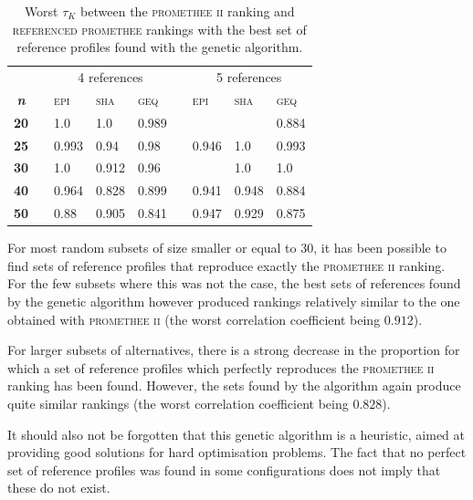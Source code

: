 \begin{table}[h]
    \centering
    \begin{tabular}{c l l l l l l l l}
        \toprule
        & & \multicolumn{3}{c}{4 references} &\phantom{abc} & \multicolumn{3}{c}{5 references} \\
        \cmidrule{3-5} \cmidrule{7-9}
        \bf \textit{n} & & \textsc{epi} &  \textsc{sha} & \textsc{geq}& &  \textsc{epi} &  \textsc{sha} & \textsc{geq}  \\
        \midrule
         \bf 20  & &  1.0   & 1.0    & 0.989 & &        &       & 0.884 \\
         \bf 25  & &  0.993 & 0.94   & 0.98  & &  0.946 &  1.0  & 0.993 \\
         \bf 30  & &  1.0   & 0.912  & 0.96  & &        &  1.0  &  1.0 \\
         \bf 40  & &  0.964 & 0.828  & 0.899 & &  0.941 &  0.948 & 0.884 \\
         \bf 50  & &  0.88  & 0.905  & 0.841 & &  0.947 &  0.929 & 0.875 \\
        \bottomrule
    \end{tabular}
    \caption{Worst $\tau_K$ between the \textsc{promethee ii} ranking and \textsc{referenced promethee} rankings with the best set of reference profiles found with the genetic algorithm.}
    \label{tbl:genetic_tau}
\end{table}
\newpage 
For most random subsets of size smaller or equal to 30, it has been possible to find sets of reference profiles that reproduce exactly the \textsc{promethee ii} ranking.
For the few subsets where this was not the case, the best sets of references found by the genetic algorithm however produced rankings relatively similar to the one obtained with \textsc{promethee ii} (the worst correlation coefficient being $0.912$).  

For larger subsets of alternatives, there is a strong decrease in the proportion for which a set of reference profiles which perfectly reproduces the \textsc{promethee ii} ranking has been found. However, the sets found by the algorithm again produce quite similar rankings (the worst correlation coefficient being $0.828$).

It should also not be forgotten that this genetic algorithm is a heuristic, aimed at providing good solutions for hard optimisation problems.
The fact that no perfect set of reference profiles was found in some configurations does not imply that these do not exist.

